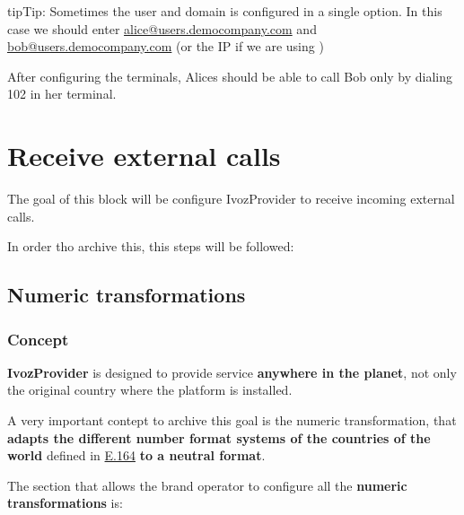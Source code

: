 \documentclass[letterpaper,10pt,english]{sphinxmanual}
\begin{document}
\begin{notice}{tip}{Tip:}
Sometimes the user and domain is configured in a single option. In this
case we should enter \href{mailto:alice@users.democompany.com}{alice@users.democompany.com} and \href{mailto:bob@users.democompany.com}{bob@users.democompany.com}
(or the IP if we are using {\hyperref[internal_calls/brand_portal:dnshack]{}})
\end{notice}

After configuring the terminals, Alices should be able to call Bob only by
dialing 102 in her terminal.


\chapter{Receive external calls}
\label{external_incoming_calls/index::doc}\label{external_incoming_calls/index:receive-external-calls}
The goal of this block will be configure IvozProvider to receive incoming
external calls.

In order tho archive this, this steps will be followed:


\section{Numeric transformations}
\label{external_incoming_calls/numeric_transformations:id1}\label{external_incoming_calls/numeric_transformations::doc}\label{external_incoming_calls/numeric_transformations:numeric-transformations}

\subsection{Concept}
\label{external_incoming_calls/numeric_transformations:concept}
\textbf{IvozProvider} is designed to provide service \textbf{anywhere in the planet}, not
only the original country where the platform is installed.

A very important contept to archive this goal is the numeric transformation,
that \textbf{adapts the different number format systems of the countries of the world}
defined in \href{https://www.itu.int/rec/T-REC-E.164/es}{E.164} \textbf{to a neutral
format}.

The section that allows the brand operator to configure all the \textbf{numeric
transformations} is:

\end{document}

